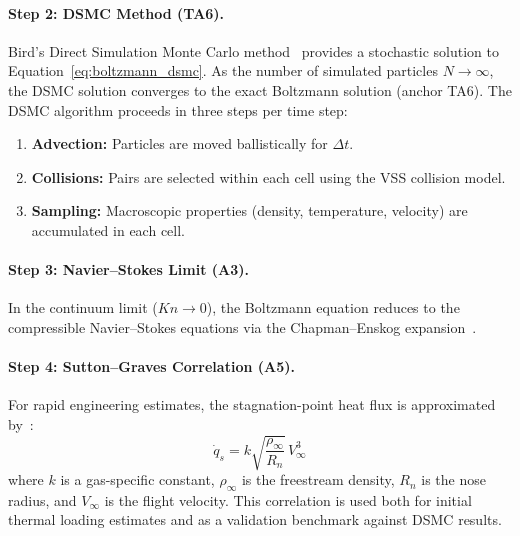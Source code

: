 \paragraph{Step 2: DSMC Method (TA6).}
Bird's Direct Simulation Monte Carlo method~\cite{bird1994molecular} provides a stochastic solution to Equation~\eqref{eq:boltzmann_dsmc}. As the number of simulated particles $N \to \infty$, the DSMC solution converges to the exact Boltzmann solution (anchor TA6). The DSMC algorithm proceeds in three steps per time step:
\begin{enumerate}
    \item \textbf{Advection:} Particles are moved ballistically for $\Delta t$.
    \item \textbf{Collisions:} Pairs are selected within each cell using the VSS collision model.
    \item \textbf{Sampling:} Macroscopic properties (density, temperature, velocity) are accumulated in each cell.
\end{enumerate}

\paragraph{Step 3: Navier--Stokes Limit (A3).}
In the continuum limit ($Kn \to 0$), the Boltzmann equation reduces to the compressible Navier--Stokes equations via the Chapman--Enskog expansion~\cite{chapman1970kinetic}. 

\paragraph{Step 4: Sutton--Graves Correlation (A5).}
For rapid engineering estimates, the stagnation-point heat flux is approximated by~\cite{sutton1971gravesh}:
\begin{equation}
\dot{q}_s = k \sqrt{\frac{\rho_\infty}{R_n}} \, V_\infty^3
\label{eq:sutton_graves_methodology}
\end{equation}
where $k$ is a gas-specific constant, $\rho_\infty$ is the freestream density, $R_n$ is the nose radius, and $V_\infty$ is the flight velocity. This correlation is used both for initial thermal loading estimates and as a validation benchmark against DSMC results.


